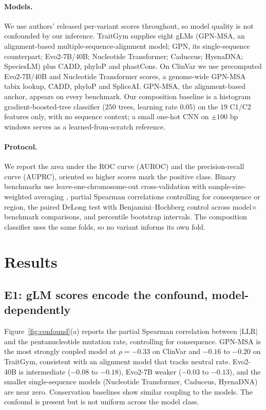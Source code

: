 \documentclass[pmlr]{jmlr}
\begin{document}
\paragraph{Models.} We use authors' released per-variant scores throughout, so model quality
is not confounded by our inference. TraitGym supplies eight gLMs (GPN-MSA, an alignment-based
multiple-sequence-alignment model; GPN, its single-sequence counterpart; Evo2-7B/40B;
Nucleotide Transformer; Caduceus; HyenaDNA; SpeciesLM) plus CADD, phyloP and phastCons. On
ClinVar we use precomputed Evo2-7B/40B and Nucleotide Transformer scores, a genome-wide
GPN-MSA tabix lookup, CADD, phyloP and SpliceAI. GPN-MSA, the alignment-based anchor, appears
on every benchmark. Our composition baseline is a histogram gradient-boosted-tree classifier
($250$ trees, learning rate $0.05$) on the $19$ C1/C2 features only, with no sequence context;
a small one-hot CNN on $\pm100$ bp windows serves as a learned-from-scratch reference.

\paragraph{Protocol.} We report the area under the ROC curve (AUROC) and the precision-recall
curve (AUPRC), oriented so higher scores mark the positive class. Binary benchmarks use
leave-one-chromosome-out cross-validation with sample-size-weighted averaging
\citep{benegas2025traitgym}, partial Spearman correlations controlling for consequence or
region, the paired DeLong test with Benjamini--Hochberg control across
model$\times$benchmark comparisons, and percentile bootstrap intervals. The composition
classifier uses the same folds, so no variant informs its own fold.

\section{Results}

\subsection{E1: gLM scores encode the confound, model-dependently}
\label{sec:e1}

Figure~\ref{fig:confound}(a) reports the partial Spearman correlation between $|\mathrm{LLR}|$
and the pentanucleotide mutation rate, controlling for consequence. GPN-MSA is the most
strongly coupled model at $\rho=-0.33$ on ClinVar and $-0.16$ to $-0.20$ on TraitGym,
consistent with an alignment model that tracks neutral rate. Evo2-40B is intermediate
($-0.08$ to $-0.18$), Evo2-7B weaker ($-0.03$ to $-0.13$), and the smaller single-sequence
models (Nucleotide Transformer, Caduceus, HyenaDNA) are near zero. Conservation baselines
show similar coupling to the models. The confound is present but is not uniform across the
model class.
\end{document}
